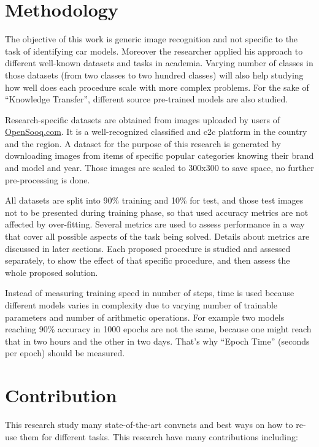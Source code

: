 \section{Methodology}

The objective of this work is generic image recognition and not specific to the task of identifying car models.
Moreover the researcher applied his approach to different well-known datasets and tasks in academia.
Varying number of classes in those datasets (from two classes to two hundred classes)
will also help studying how well does each procedure scale with more complex problems.
For the sake of ``Knowledge Transfer'', different source pre-trained models are also studied.

Research-specific datasets are obtained from images uploaded by users of \href{http://opensooq.com}{OpenSooq.com}.
It is a well-recognized classified and \gls{c2c} platform in the country and the region.
A dataset for the purpose of this research is generated by downloading images from items of specific popular
categories knowing their brand and model and year.
Those images are scaled to 300x300 to save space, no further pre-processing is done.

All datasets are split into 90\% training and 10\% for test,
and those test images not to be presented during training phase,
so that used accuracy metrics are not affected by over-fitting.
Several metrics are used to assess performance in a way that cover all possible aspects of the task being solved.
Details about metrics are discussed in later sections.
Each proposed procedure is studied and assessed separately, to show the effect of that specific procedure,
and then assess the whole proposed solution.

Instead of measuring training speed in number of steps,
time is used because different models varies in complexity
due to varying number of trainable parameters and number of arithmetic operations.
For example two models reaching 90\% accuracy in 1000 epochs are not the same,
because one might reach that in two hours and the other in two days.
That's why ``Epoch Time'' (seconds per epoch) should be measured.

\section{Contribution}

This research study many state-of-the-art \glspl{convnet} and best ways on how to re-use them for different tasks.
This research have many contributions including:

